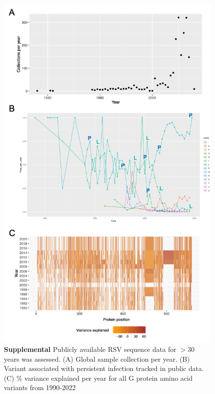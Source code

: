\documentclass{article}
\begin{document}
\begin{figure}[ht] \hspace{-0.5cm} \begin{center}
    \includegraphics[scale=0.6]{S2}
	\caption{\textbf{Supplemental} Publicly available RSV sequence data for $>30$ years was assessed. (A) Global sample collection per year. (B) Variant associated with persistent infection tracked in public data. (C) \% variance explained per year for all G protein amino acid variants from 1990-2022} 
	\label{fig:S2} \end{center}
\end{figure}
\end{document}
